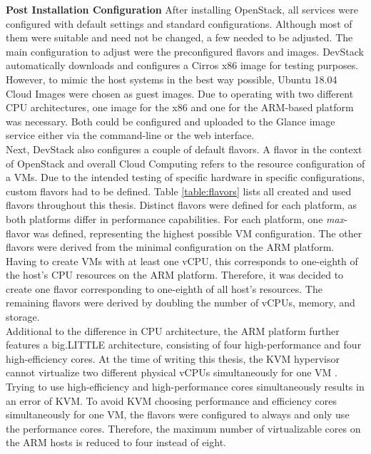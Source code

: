             \newpage
             \noindent \textbf{Post Installation Configuration}
            After installing OpenStack, all services were configured with default settings and standard configurations. 
            Although most of them were suitable and need not be changed, a few needed to be adjusted.
            The main configuration to adjust were the preconfigured flavors and images.
            DevStack automatically downloads and configures a Cirros x86 image for testing purposes.
            However, to mimic the host systems in the best way possible, Ubuntu 18.04 Cloud Images were chosen as guest images.
            Due to operating with two different \ac{CPU} architectures, one image for the x86 and one for the ARM-based platform was necessary.
            Both could be configured and uploaded to the Glance image service either via the command-line or the web interface.\\
            Next, DevStack also configures a couple of default flavors.
            A flavor in the context of OpenStack and overall Cloud Computing refers to the resource configuration of a \acp{VM}.
            Due to the intended testing of specific hardware in specific configurations, custom flavors had to be defined.
            Table \ref{table:flavors} lists all created and used flavors throughout this thesis.
            Distinct flavors were defined for each platform, as both platforms differ in performance capabilities.
            For each platform, one \textsl{max}-flavor was defined, representing the highest possible \ac{VM} configuration.
            The other flavors were derived from the minimal configuration on the ARM platform.
            Having to create \acp{VM} with at least one \ac{vCPU}, this corresponds to one-eighth of the host's \ac{CPU} resources on the ARM platform.
            Therefore, it was decided to create one flavor corresponding to one-eighth of all host's resources.
            The remaining flavors were derived by doubling the number of \acp{vCPU}, memory, and storage.\\
            Additional to the difference in \ac{CPU} architecture, the ARM platform further features a big.LITTLE architecture, consisting of four high-performance and four high-efficiency cores.
            At the time of writing this thesis, the KVM hypervisor cannot virtualize two different physical vCPUs simultaneously for one VM \cite{RussianNeuroMancer2019}.
            Trying to use high-efficiency and high-performance cores simultaneously results in an error of \ac{KVM}.
            To avoid \ac{KVM} choosing performance and efficiency cores simultaneously for one \ac{VM}, the flavors were configured to always and only use the performance cores.
            Therefore, the maximum number of virtualizable cores on the ARM hosts is reduced to four instead of eight.
             
